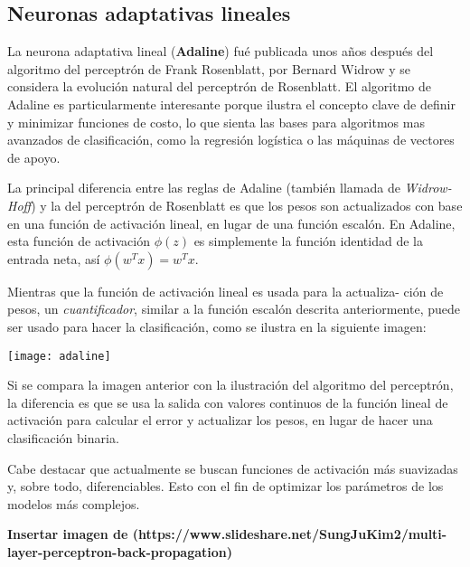 \subsection{Neuronas adaptativas lineales}
La neurona adaptativa lineal (\textbf{Adaline}) fué publicada unos años
después del algoritmo del perceptrón de Frank Rosenblatt, por Bernard
Widrow \cite{adaline} y se considera la evolución natural del perceptrón
de Rosenblatt.
El algoritmo de Adaline es particularmente interesante porque ilustra
el concepto clave de definir y minimizar funciones de costo, lo que
sienta las bases para algoritmos mas avanzados de clasificación,
como la regresión logística o las máquinas de vectores de apoyo.

La principal diferencia entre las reglas de Adaline (también llamada
de \textit{Widrow-Hoff}) y la del perceptrón de Rosenblatt es que los
pesos son actualizados con base en una función de activación lineal,
en lugar de una función escalón. En Adaline, esta función de activación
$\phi (z)$ es simplemente la función identidad de la entrada neta, así
$\phi (w^T x) = w^T x$.

Mientras que la función de activación lineal es usada para la actualiza-
ción de pesos, un \textit{cuantificador}, similar a la función escalón
descrita anteriormente, puede ser usado para hacer la clasificación,
como se ilustra en la siguiente imagen:

\texttt{[image: adaline]}\cite{python}

Si se compara la imagen anterior con la ilustración del algoritmo del
perceptrón, la diferencia es que se usa la salida con valores continuos
de la función lineal de activación para calcular el error y actualizar
los pesos, en lugar de hacer una clasificación binaria.

Cabe destacar que actualmente se buscan funciones de activación más
suavizadas y, sobre todo, diferenciables. Esto con el fin de optimizar
los parámetros de los modelos más complejos.

\textbf{Insertar imagen de (https://www.slideshare.net/SungJuKim2/multi-layer-perceptron-back-propagation)}
